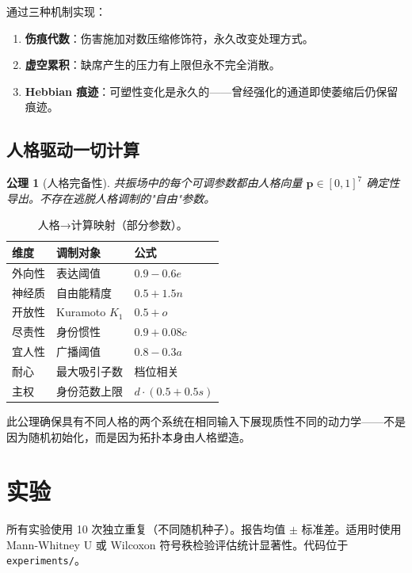 \documentclass[UTF8,11pt]{ctexart}
\newtheorem{axiom}{公理}[section]
\begin{document}
通过三种机制实现：
\begin{enumerate}[leftmargin=*]
\item \textbf{伤痕代数}：伤害施加对数压缩修饰符，永久改变处理方式。
\item \textbf{虚空累积}：缺席产生的压力有上限但永不完全消散。
\item \textbf{Hebbian 痕迹}：可塑性变化是永久的——曾经强化的通道即使萎缩后仍保留痕迹。
\end{enumerate}

\subsection{人格驱动一切计算}
\label{sec:personality_axiom}

\begin{axiom}[人格完备性]
共振场中的每个可调参数都由人格向量 $\mathbf{p} \in [0,1]^7$ 确定性导出。不存在逃脱人格调制的"自由"参数。
\end{axiom}

\begin{table}[htbp]
\centering
\caption{人格→计算映射（部分参数）。}
\label{tab:personality}
\begin{tabular}{@{}lll@{}}
\toprule
维度 & 调制对象 & 公式 \\
\midrule
外向性 & 表达阈值 & $0.9 - 0.6e$ \\
神经质 & 自由能精度 & $0.5 + 1.5n$ \\
开放性 & Kuramoto $K_1$ & $0.5 + o$ \\
尽责性 & 身份惯性 & $0.9 + 0.08c$ \\
宜人性 & 广播阈值 & $0.8 - 0.3a$ \\
耐心 & 最大吸引子数 & 档位相关 \\
主权 & 身份范数上限 & $d \cdot (0.5 + 0.5s)$ \\
\bottomrule
\end{tabular}
\end{table}

此公理确保具有不同人格的两个系统在相同输入下展现质性不同的动力学——不是因为随机初始化，而是因为拓扑本身由人格塑造。

\section{实验}
\label{sec:experiments}

所有实验使用 10 次独立重复（不同随机种子）。报告均值 $\pm$ 标准差。适用时使用 Mann-Whitney U 或 Wilcoxon 符号秩检验评估统计显著性。代码位于 \texttt{experiments/}。
\end{document}
